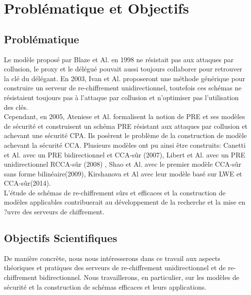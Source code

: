 \documentclass[twoside,french,11pt]{amsart}
\begin{document}
\section{Problématique et Objectifs}
\subsection{Problématique}
Le modèle proposé par Blaze et Al.\cite{blaze98} en 1998  ne résistait pas aux attaques par collusion, le proxy et le délégué pouvait aussi toujours collaborer pour retrouver la clé du délégant. En 2003, Ivan et Al.\cite{ivan2003proxy} proposeront une méthode générique pour construire un serveur de re-chiffrement unidirectionnel, toutefois ces schémas ne résistaient toujours pas à l'attaque par collusion et n'optimiser pas l'utilisation des clés.\\
Cependant, en 2005, Ateniese et Al. \cite{ateniese2006improved} formalisent la notion de PRE et ses modèles de sécurité et construisent un schéma PRE résistant aux attaques par collusion et achevant une sécurité CPA. Ils posèrent le problème de la construction de modèle achevant la sécurité CCA. Plusieurs modèles ont pu ainsi être construits: Canetti et Al. avec un PRE bidirectionnel et CCA-sûr (2007)\cite{canetti2007chosen}, Libert et Al. avec un PRE unidirectionnel RCCA-sûr (2008) \cite{libert2008unidirectional}, Shao et Al. avec le premier modèle CCA-sûr sans forme bilinéaire(2009)\cite{shao2009cca}, Kirshanova et Al avec leur modèle basé sur LWE et CCA-sûr(2014)\cite{kirshanova2014proxy}.\\
L'étude de schémas de re-chiffrement sûrs et efficaces et la construction de modèles applicables contribuerait au développement de la recherche et la mise en ?uvre des serveurs de chiffrement.  

 \subsection{Objectifs Scientifiques}
De manière concrète, nous nous intéresserons dans ce travail aux aspects théoriques et pratiques des serveurs de re-chiffrement unidirectionnel et de re-chiffrement bidirectionnel. Nous travaillerons, en particulier, sur les modèles de sécurité et la construction de schémas efficaces et leurs applications.
\end{document}
